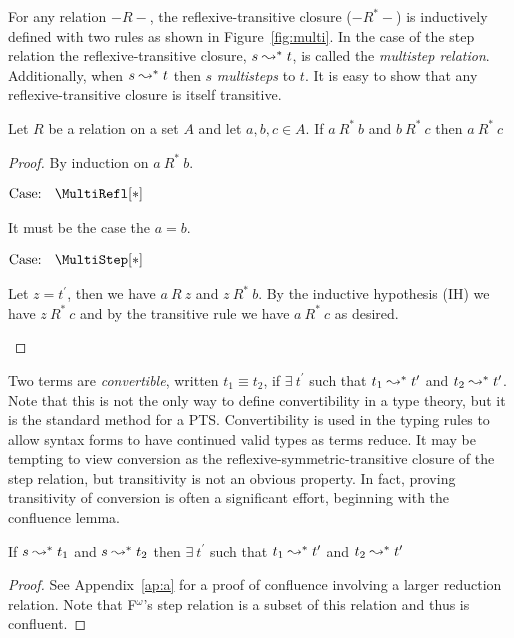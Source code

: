 

For any relation $-R-$, the reflexive-transitive closure ($-R^*-$) is inductively defined with two rules as shown in Figure~\ref{fig:multi}.
In the case of the step relation the reflexive-transitive closure, $s \leadsto^* t$, is called the \textit{multistep relation}.
Additionally, when $s \leadsto^* t$ then $s$ \textit{multisteps} to $t$.
It is easy to show that any reflexive-transitive closure is itself transitive.

\begin{lemma}
    Let $R$ be a relation on a set $A$ and let $a, b, c \in A$. If $a\ R^*\ b$ and $b\ R^*\ c$ then $a\ R^*\ c$
\end{lemma}
\begin{proof}
    By induction on $a\ R^*\ b$.

    $\text{Case: }\begin{array}{c} \MultiRefl[*] \end{array}$
    \begin{proofcase}
        It must be the case the $a = b$.
    \end{proofcase}

    $\text{Case: }\begin{array}{c} \MultiStep[*] \end{array}$
    \begin{proofcase}
        Let $z = t^\prime$, then we have $a\ R\ z$ and $z\ R^*\ b$.
        By the inductive hypothesis (IH) we have $z\ R^*\ c$ and by the transitive rule we have $a\ R^*\ c$ as desired.
    \end{proofcase}
\end{proof}

Two terms are \textit{convertible}, written $t_1 \equiv t_2$, if $\exists\ t^\prime$ such that $t_1 \leadsto^* t^\prime$ and $t_2 \leadsto^* t^\prime$.
Note that this is not the only way to define convertibility in a type theory, but it is the standard method for a PTS.
Convertibility is used in the typing rules to allow syntax forms to have continued valid types as terms reduce.
It may be tempting to view conversion as the reflexive-symmetric-transitive closure of the step relation, but transitivity is not an obvious property.
In fact, proving transitivity of conversion is often a significant effort, beginning with the confluence lemma.

\begin{lemma}[Confluence]
    If $s \leadsto^* t_1$ and $s \leadsto^* t_2$ then $\exists\ t^\prime$ such that $t_1 \leadsto^* t^\prime$ and $t_2 \leadsto^* t^\prime$
\end{lemma}
\begin{proof}
    See Appendix~\ref{ap:a} for a proof of confluence involving a larger reduction relation. Note that F$^\omega$'s step relation is a subset of this relation and thus is confluent.
\end{proof}

